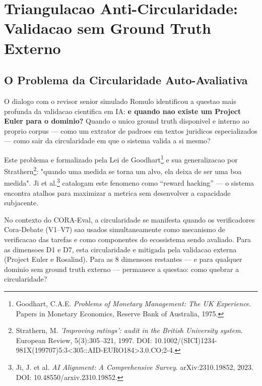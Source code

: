 
\section{Triangulacao Anti-Circularidade: Validacao sem Ground Truth Externo}

\subsection{O Problema da Circularidade Auto-Avaliativa}

O dialogo com o revisor senior simulado Romulo identificou a questao mais
profunda da validacao cientifica em IA: \textbf{e quando nao existe um Project
Euler para o dominio?} Quando o unico ground truth disponivel e interno ao
proprio corpus — como um extrator de padroes em textos juridicos
especializados — como sair da circularidade em que o sistema valida a si mesmo?

Este problema e formalizado pela Lei de Goodhart\footnote{Goodhart, C.A.E.
\textit{Problems of Monetary Management: The UK Experience}. Papers in Monetary
Economics, Reserve Bank of Australia, 1975.} e sua generalizacao por
Strathern\footnote{Strathern, M. \textit{'Improving ratings': audit in the
British University system}. European Review, 5(3):305--321, 1997. DOI:
10.1002/(SICI)1234-981X(199707)5:3<305::AID-EURO184>3.0.CO;2-4.}: "quando uma
medida se torna um alvo, ela deixa de ser uma boa medida". Ji et
al.\footnote{Ji, J. et al. \textit{AI Alignment: A Comprehensive Survey}.
arXiv:2310.19852, 2023. DOI: 10.48550/arxiv.2310.19852.} catalogam este
fenomeno como ``reward hacking'' — o sistema encontra atalhos para maximizar
a metrica sem desenvolver a capacidade subjacente.

No contexto do CORA-Eval, a circularidade se manifesta quando os verificadores
Cora-Debate (V1--V7) sao usados simultaneamente como mecanismo de verificacao
das tarefas e como componentes do ecossistema sendo avaliado. Para as dimensoes
D1 e D7, esta circularidade e mitigada pela validacao externa (Project Euler e
Rosalind). Para as 8 dimensoes restantes — e para qualquer dominio sem ground
truth externo — permanece a questao: como quebrar a circularidade?


